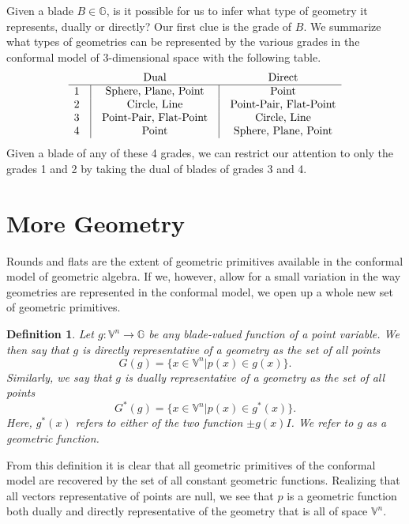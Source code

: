 \documentclass[12pt]{article}
\newcommand{\G}{\mathbb{G}}
\newcommand{\V}{\mathbb{V}}
\newtheorem{definition}{Definition}[section]
\begin{document}
Given a blade $B\in\G$, is it possible for us to infer what type of geometry it
represents, dually or directly?  Our first clue is the grade of $B$.
We summarize what types of geometries can be represented by the various
grades in the conformal model of 3-dimensional space with the following table.
\begin{equation*}
\begin{array}{ccccc}
 &  & \mbox{Dual} & & \mbox{Direct} \\
\hline
1 & \vline & \mbox{Sphere, Plane, Point} & \vline & \mbox{Point} \\
2 & \vline & \mbox{Circle, Line} & \vline & \mbox{Point-Pair, Flat-Point} \\
3 & \vline & \mbox{Point-Pair, Flat-Point} & \vline & \mbox{Circle, Line} \\
4 & \vline & \mbox{Point} & \vline & \mbox{Sphere, Plane, Point}
\end{array}
\end{equation*}
Given a blade of any of these 4 grades, we can restrict our attention to
only the grades 1 and 2 by taking the dual of blades of grades 3 and 4.


\section{More Geometry}

Rounds and flats are the extent of geometric primitives available in the conformal
model of geometric algebra.  If we, however, allow for a small variation in the way
geometries are represented in the conformal model, we open up a whole new set
of geometric primitives.

\begin{definition}
Let $g:\V^n\to\G$ be any blade-valued function of a point variable.
We then say that $g$ is directly representative of a geometry as
the set of all points
\begin{equation*}
G(g)=\{x\in\V^n|p(x)\in g(x)\}.
\end{equation*}
Similarly, we say that $g$ is dually representative of a geometry as the set
of all points
\begin{equation*}
G^*(g) = \{x\in\V^n|p(x)\in g^*(x)\}.
\end{equation*}
Here, $g^*(x)$ refers to either of the two function $\pm g(x)I$.
We refer to $g$ as a geometric function.
\end{definition}
From this definition it is clear that all geometric primitives of the conformal model
are recovered by the set of all constant geometric functions.  Realizing that
all vectors representative of points are null, we see that $p$ is a geometric
function both dually and directly representative of the geometry that is all
of space $\V^n$.
\end{document}
